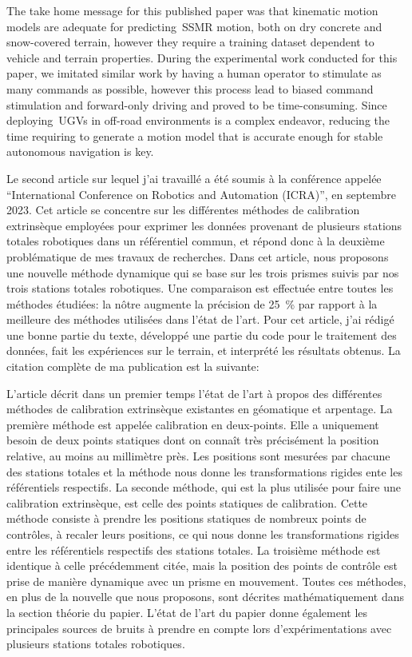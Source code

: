 The take home message for this published paper was that kinematic motion models are adequate for predicting~\ac{SSMR} motion, both on dry concrete and snow-covered terrain, however they require a training dataset dependent to vehicle and terrain properties.
During the experimental work conducted for this paper, we imitated similar work by having a human operator to stimulate as many commands as possible, however this process lead to biased command stimulation and forward-only driving and proved to be time-consuming.
Since deploying~\acp{UGV} in off-road environments is a complex endeavor, reducing the time requiring to generate a motion model that is accurate enough for stable autonomous navigation is key.

\begin{center}
	\textbf{}
\end{center}

Le second article sur lequel j'ai travaillé a été soumis à la conférence appelée ``International Conference on Robotics and Automation (ICRA)'', en septembre 2023.
Cet article se concentre sur les différentes méthodes de calibration extrinsèque employées pour exprimer les données provenant de plusieurs stations totales robotiques dans un référentiel commun, et répond donc à la deuxième problématique de mes travaux de recherches.
Dans cet article, nous proposons une nouvelle méthode dynamique qui se base sur les trois prismes suivis par nos trois stations totales robotiques.
Une comparaison est effectuée entre toutes les méthodes étudiées: la nôtre augmente la précision de \SI{25}{\%} par rapport à la meilleure des méthodes utilisées dans l'état de l'art.
Pour cet article, j'ai rédigé une bonne partie du texte, développé une partie du code pour le traitement des données, fait les expériences sur le terrain, et interprété les résultats obtenus.
La citation complète de ma publication est la suivante:

L'article décrit dans un premier temps l'état de l'art à propos des différentes méthodes de calibration extrinsèque existantes en géomatique et arpentage.
La première méthode est appelée calibration en deux-points.
Elle a uniquement besoin de deux points statiques dont on connaît très précisément la position relative, au moins au millimètre près.
Les positions sont mesurées par chacune des stations totales et la méthode nous donne les transformations rigides ente les référentiels respectifs.
La seconde méthode, qui est la plus utilisée pour faire une calibration extrinsèque, est celle des points statiques de calibration.
Cette méthode consiste à prendre les positions statiques de nombreux points de contrôles, à recaler leurs positions, ce qui nous donne les transformations rigides entre les référentiels respectifs des stations totales.
La troisième méthode est identique à celle précédemment citée, mais la position des points de contrôle est prise de manière dynamique avec un prisme en mouvement. 
Toutes ces méthodes, en plus de la nouvelle que nous proposons, sont décrites mathématiquement dans la section théorie du papier.
L'état de l'art du papier donne également les principales sources de bruits à prendre en compte lors d'expérimentations avec plusieurs stations totales robotiques.

